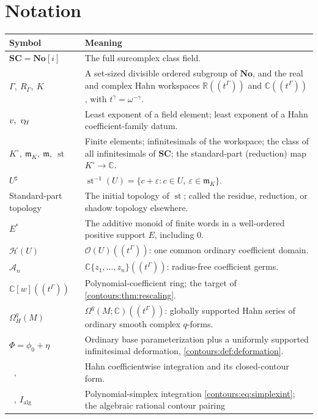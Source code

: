 \documentclass[11pt,letterpaper]{article}
\theoremstyle{definition}
\theoremstyle{remark}
\newcommand{\No}{\mathbf{No}}\newcommand{\SC}{\mathbf{SC}}
\newcommand{\R}{\mathbb R}\newcommand{\C}{\mathbb C}\newcommand{\Q}{\mathbb Q}
\newcommand{\HH}{\mathcal H}\newcommand{\A}{\mathscr A}\newcommand{\OO}{\mathcal O}
\newcommand{\m}{\mathfrak m}\newcommand{\st}{\operatorname{st}}
\newcommand{\HInt}{\mathop{\int^{\!H}}\nolimits}
\newcommand{\HCoint}{\mathop{\oint^{\!H}}\nolimits}
\newcommand{\PInt}{\mathop{\int^{\!\mathrm{pol}}}\nolimits}
\newcommand{\sh}{^{\sharp}}\newcommand{\dd}{\,d}
\numberwithin{equation}{section}
\begin{document}
\section{Notation}
\label{contours:app:notation}
\begin{center}\small
\begin{longtable}{@{}L{0.26\textwidth}L{0.66\textwidth}@{}}
\toprule
Symbol & Meaning\\\midrule\endhead
$\SC=\No[i]$ & The full surcomplex class field.\\[0.35em]
$\Gamma,\ R_\Gamma,\ K$ & A set-sized divisible ordered subgroup of $\No$, and the
  real and complex Hahn workspaces $\R((t^\Gamma))$ and $\C((t^\Gamma))$, with
  $t^\gamma=\omega^{-\gamma}$.\\[0.35em]
$v,\ v_{\!H}$ & Least exponent of a field element; least exponent of a Hahn
  coefficient-family datum.\\[0.35em]
$K^\circ,\ \m_K,\ \m,\ \st$ & Finite elements; infinitesimals of the workspace; the
  class of all infinitesimals of $\SC$; the standard-part (reduction) map
  $K^\circ\to\C$.\\[0.35em]
$U\sh$ & $\st^{-1}(U)=\{c+\varepsilon:c\in U,\ \varepsilon\in\m_K\}$.\\[0.35em]
Standard-part topology & The initial topology of $\st$; called the residue, reduction,
  or shadow topology elsewhere.\\[0.35em]
$E^*$ & The additive monoid of finite words in a well-ordered positive support $E$,
  including $0$.\\[0.35em]
$\HH(U)$ & $\OO(U)((t^\Gamma))$: one common ordinary coefficient domain.\\[0.35em]
$\A_n$ & $\C\{z_1,\ldots,z_n\}((t^\Gamma))$: radius-free coefficient germs.\\[0.35em]
$\C[w]((t^\Gamma))$ & Polynomial-coefficient ring; the target of
  \cref{contours:thm:rescaling}.\\[0.35em]
$\Omega_H^q(M)$ & $\Omega^q(M;\C)((t^\Gamma))$: globally supported Hahn series of
  ordinary smooth complex $q$-forms.\\[0.35em]
$\Phi=\phi_0+\eta$ & Ordinary base parameterization plus a uniformly supported
  infinitesimal deformation, \cref{contours:def:deformation}.\\[0.35em]
$\HInt,\ \HCoint$ & Hahn coefficientwise integration and its closed-contour
  form.\\[0.35em]
$\PInt,\ I_{\mathrm{alg}}$ & Polynomial-simplex integration
  \eqref{contours:eq:simplexint}; the algebraic rational contour pairing

\end{longtable}
\end{center}
\end{document}

